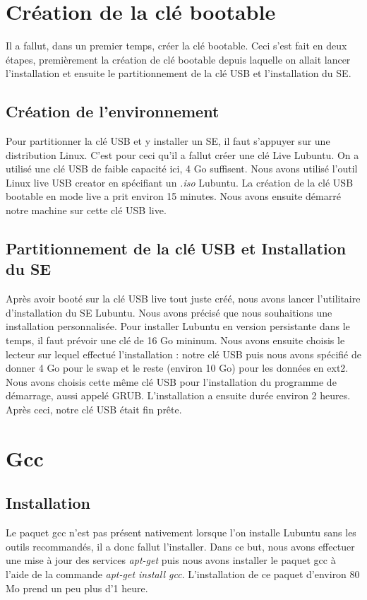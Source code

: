 \documentclass[final]{polytech/polytech}
\begin{document}
\section{Création de la clé bootable}
Il a fallut, dans un premier temps, créer la clé bootable. Ceci s'est fait en deux étapes, premièrement la création de clé bootable depuis laquelle on allait lancer l'installation et ensuite le partitionnement de la clé USB et l'installation du SE.

\subsection{Création de l'environnement}
Pour partitionner la clé USB et y installer un SE, il faut s'appuyer sur une distribution Linux. C'est pour ceci qu'il a fallut créer une clé Live Lubuntu. On a utilisé une clé USB de faible capacité ici, 4 Go suffisent. Nous avons utilisé l'outil Linux live USB creator en spécifiant un \textit{.iso} Lubuntu. La création de la clé USB bootable en mode live a prit environ 15 minutes. Nous avons ensuite démarré notre machine sur cette clé USB live.

\subsection{Partitionnement de la clé USB et Installation du SE}
Après avoir booté sur la clé USB live tout juste créé, nous avons lancer l'utilitaire d'installation du SE Lubuntu. Nous avons précisé que nous souhaitions une installation personnalisée. Pour installer Lubuntu en version persistante dans le temps, il faut prévoir une clé de 16 Go mininum. Nous avons ensuite choisis le lecteur sur lequel effectué l'installation : notre clé USB puis nous avons spécifié de donner 4 Go pour le swap et le reste (environ 10 Go) pour les données en ext2. Nous avons choisis cette même clé USB pour l'installation du programme de démarrage, aussi appelé GRUB. L'installation a ensuite durée environ 2 heures. Après ceci, notre clé USB était fin prête.

\section{Gcc}

\subsection{Installation}
Le paquet gcc n'est pas présent nativement lorsque l'on installe Lubuntu sans les outils recommandés, il a donc fallut l'installer. Dans ce but, nous avons effectuer une mise à jour des services \textit{apt-get} puis nous avons installer le paquet gcc à l'aide de la commande \textit{apt-get install gcc}. L'installation de ce paquet d'environ 80 Mo prend un peu plus d'1 heure.
\end{document}
